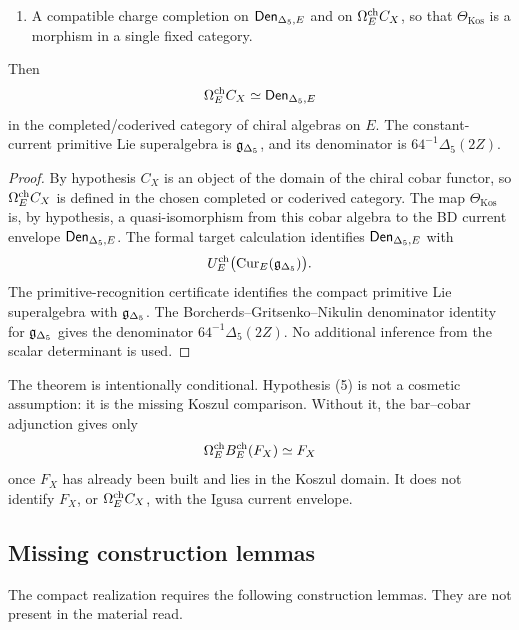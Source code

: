 \begin{theorem}
\begin{enumerate}
\item A compatible charge completion on \(\mathsf{Den}_{\Delta_5,E}\) and on
\(\Omega^{\mathrm{ch}}_E C_X\), so that \(\Theta_{\mathrm{Kos}}\) is a morphism in a
single fixed category.
\end{enumerate}
Then
\[
        \Omega^{\mathrm{ch}}_E C_X\simeq \mathsf{Den}_{\Delta_5,E}
\]
in the completed/coderived category of chiral algebras on \(E\).  The
constant-current primitive Lie superalgebra is \(\mathfrak g_{\Delta_5}\), and its
denominator is \(64^{-1}\Delta_5(2Z)\).
\end{theorem}

\begin{proof}
By hypothesis \(C_X\) is an object of the domain of the chiral cobar
functor, so \(\Omega^{\mathrm{ch}}_E C_X\) is defined in the chosen completed or
coderived category.  The map \(\Theta_{\mathrm{Kos}}\) is, by
hypothesis, a quasi-isomorphism from this cobar algebra to the BD
current envelope \(\mathsf{Den}_{\Delta_5,E}\).  The formal target calculation identifies
\(\mathsf{Den}_{\Delta_5,E}\) with
\[
        U_E^{\mathrm{ch}}\bigl(\operatorname{Cur}_E(\mathfrak g_{\Delta_5})\bigr).
\]
The primitive-recognition certificate identifies the compact primitive
Lie superalgebra with \(\mathfrak g_{\Delta_5}\).  The Borcherds--Gritsenko--Nikulin
denominator identity for \(\mathfrak g_{\Delta_5}\) gives the denominator
\(64^{-1}\Delta_5(2Z)\).  No additional inference from the scalar
determinant is used.
\end{proof}

The theorem is intentionally conditional.  Hypothesis (5) is not a
cosmetic assumption: it is the missing Koszul comparison.  Without it,
the bar--cobar adjunction gives only
\[
        \Omega^{\mathrm{ch}}_EB^{\mathrm{ch}}_E(F_X)\simeq F_X
\]
once \(F_X\) has already been built and lies in the Koszul domain.  It
does not identify \(F_X\), or \(\Omega^{\mathrm{ch}}_E C_X\), with the Igusa current
envelope.

\subsection{Missing construction lemmas}

The compact realization requires the following construction lemmas.
They are not present in the material read.

